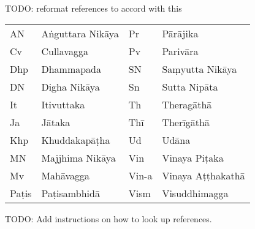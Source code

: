 \clearpage
{}
\bigskip

TODO: reformat references to accord with this

\bigskip

\begin{tabular}{@{}ll ll@{}}
  AN & Aṅguttara Nikāya & Pr & Pārājika\\
  Cv & Cullavagga &       Pv & Parivāra\\
  Dhp & Dhammapada &      SN & Saṃyutta Nikāya \\
  DN & Digha Nikāya  &    Sn & Sutta Nipāta\\
  It & Itivuttaka &       Th & Theragāthā \\
  Ja & Jātaka &           Thī & Therīgāthā\\
  Khp & Khuddakapāṭha &   Ud & Udāna\\
  MN & Majjhima Nikāya &  Vin & Vinaya Piṭaka\\
  Mv & Mahāvagga &        Vin-a & Vinaya Aṭṭhakathā\\
  Paṭis & Paṭisambhidā &  Vism & Visuddhimagga\\
\end{tabular}

\bigskip

{}
\bigskip

TODO: Add instructions on how to look up references.

